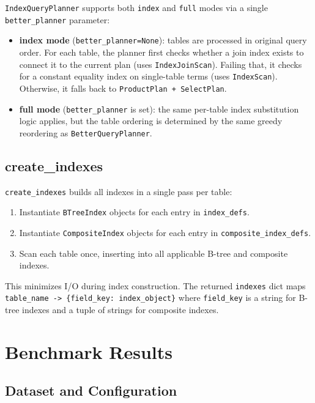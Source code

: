 \documentclass[12pt,a4paper]{article}
\begin{document}
\texttt{IndexQueryPlanner} supports both \texttt{index} and \texttt{full} modes via a single \texttt{better\_planner} parameter:

\begin{itemize}[nosep]
  \item \textbf{index mode} (\texttt{better\_planner=None}): tables are processed in original query order. For each table, the planner first checks whether a join index exists to connect it to the current plan (uses \texttt{IndexJoinScan}). Failing that, it checks for a constant equality index on single-table terms (uses \texttt{IndexScan}). Otherwise, it falls back to \texttt{ProductPlan + SelectPlan}.
  \item \textbf{full mode} (\texttt{better\_planner} is set): the same per-table index substitution logic applies, but the table ordering is determined by the same greedy reordering as \texttt{BetterQueryPlanner}.
\end{itemize}

\subsection{create\_indexes}

\texttt{create\_indexes} builds all indexes in a single pass per table:

\begin{enumerate}[nosep]
  \item Instantiate \texttt{BTreeIndex} objects for each entry in \texttt{index\_defs}.
  \item Instantiate \texttt{CompositeIndex} objects for each entry in \texttt{composite\_index\_defs}.
  \item Scan each table once, inserting into all applicable B-tree and composite indexes.
\end{enumerate}

This minimizes I/O during index construction. The returned \texttt{indexes} dict maps \texttt{table\_name -> \{field\_key: index\_object\}} where \texttt{field\_key} is a string for B-tree indexes and a tuple of strings for composite indexes.

\section{Benchmark Results}

\subsection{Dataset and Configuration}
\end{document}
